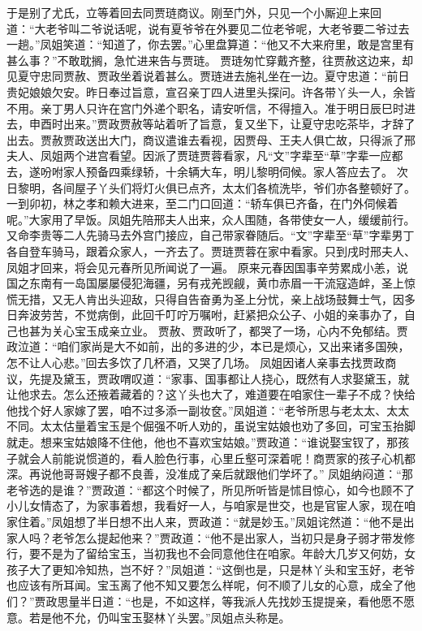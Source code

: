 \documentclass[12pt,oneside]{book}
\begin{document}
于是别了尤氏，立等着回去同贾琏商议。刚至门外，只见一个小厮迎上来回道：“大老爷叫二爷说话呢，说有夏爷爷在外要见二位老爷呢，大老爷要二爷过去一趟。”凤姐笑道：“知道了，你去罢。”心里盘算道：“他又不大来府里，敢是宫里有甚么事？”不敢耽搁，急忙进来告与贾琏。
贾琏匆忙穿戴齐整，往贾赦这边来，却见夏守忠同贾赦、贾政坐着说着甚么。贾琏进去施礼坐在一边。夏守忠道：“前日贵妃娘娘欠安。昨日奉过旨意，宣召亲丁四人进里头探问。许各带丫头一人，余皆不用。亲丁男人只许在宫门外递个职名，请安听信，不得擅入。准于明日辰巳时进去，申酉时出来。”贾政贾赦等站着听了旨意，复又坐下，让夏守忠吃茶毕，才辞了出去。贾赦贾政送出大门，商议遣谁去看视，因贾母、王夫人俱亡故，只得派了邢夫人、凤姐两个进宫看望。因派了贾琏贾蓉看家，凡“文”字辈至“草”字辈一应都去，遂吩咐家人预备四乘绿轿，十余辆大车，明儿黎明伺候。家人答应去了。
次日黎明，各间屋子丫头们将灯火俱已点齐，太太们各梳洗毕，爷们亦各整顿好了。一到卯初，林之孝和赖大进来，至二门口回道：“轿车俱已齐备，在门外伺候着呢。”大家用了早饭。凤姐先陪邢夫人出来，众人围随，各带使女一人，缓缓前行。又命李贵等二人先骑马去外宫门接应，自己带家眷随后。“文”字辈至“草”字辈男丁各自登车骑马，跟着众家人，一齐去了。贾琏贾蓉在家中看家。只到戌时邢夫人、凤姐才回来，将会见元春所见所闻说了一遍。
原来元春因国事辛劳累成小恙，说国之东南有一岛国屡屡侵犯海疆，另有戎羌觊觎，黄巾赤眉一干流寇造衅，圣上惊慌无措，又无人肯出头迎敌，只得自告奋勇为圣上分忧，亲上战场鼓舞士气，因多日奔波劳苦，不觉病倒，此回千叮咛万嘱咐，赶紧把众公子、小姐的亲事办了，自己也甚为关心宝玉成亲立业。
贾赦、贾政听了，都哭了一场，心内不免郁结。贾政泣道：“咱们家尚是大不如前，出的多进的少，本已是烦心，又出来诸多国殃，怎不让人心悲。”回去多饮了几杯酒，又哭了几场。
凤姐因诸人亲事去找贾政商议，先提及黛玉，贾政喟叹道：“家事、国事都让人挠心，既然有人求娶黛玉，就让他求去。怎么还掖着藏着的？这丫头也大了，难道要在咱家住一辈子不成？快给他找个好人家嫁了罢，咱不过多添一副妆奁。”凤姐道：“老爷所思与老太太、太太不同。太太估量着宝玉是个倔强不听人劝的，虽说宝姑娘也劝了多回，可宝玉抬脚就走。想来宝姑娘降不住他，他也不喜欢宝姑娘。”贾政道：“谁说娶宝钗了，那孩子就会人前能说惯道的，看人脸色行事，心里丘壑可深着呢！商贾家的孩子心机都深。再说他哥哥嫂子都不良善，没准成了亲后就跟他们学坏了。”
凤姐纳闷道：“那老爷选的是谁？”贾政道：“都这个时候了，所见所听皆是怵目惊心，如今也顾不了小儿女情态了，为家事着想，我看好一人，与咱家是世交，也是官宦人家，现在咱家住着。”凤姐想了半日想不出人来，贾政道：“就是妙玉。”凤姐诧然道：“他不是出家人吗？老爷怎么提起他来？”贾政道：“他不是出家人，当初只是身子弱才带发修行，要不是为了留给宝玉，当初我也不会同意他住在咱家。年龄大几岁又何妨，女孩子大了更知冷知热，岂不好？”凤姐道：“这倒也是，只是林丫头和宝玉好，老爷也应该有所耳闻。宝玉离了他不知又要怎么样呢，何不顺了儿女的心意，成全了他们？”贾政思量半日道：“也是，不如这样，等我派人先找妙玉提提亲，看他愿不愿意。若是他不允，仍叫宝玉娶林丫头罢。”凤姐点头称是。
\end{document}
